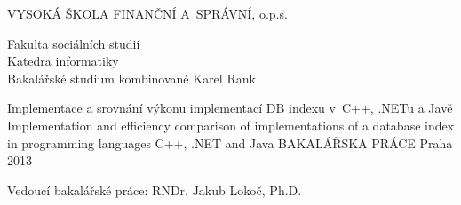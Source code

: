 \begin{titlepage}
\begin{center}
{\Large VYSOKÁ ŠKOLA FINANČNÍ A~SPRÁVNÍ, o.p.s.}

{\large Fakulta sociálních studií\\
Katedra informatiky\\
Bakalářské studium kombinované}
\vfill
{\Large Karel Rank\\[1in]}

{\large Implementace a srovnání výkonu implementací DB indexu v~C++, .NETu a Javě\\
Implementation and efficiency comparison of implementations of a database index in programming languages C++, .NET and Java}
\vfill
{\Large BAKALÁŘSKA PRÁCE}
\vfill
{\large Praha 2013}

\end{center}
{\large Vedoucí bakalářské práce: RNDr. Jakub Lokoč, Ph.D.}
\end{titlepage}